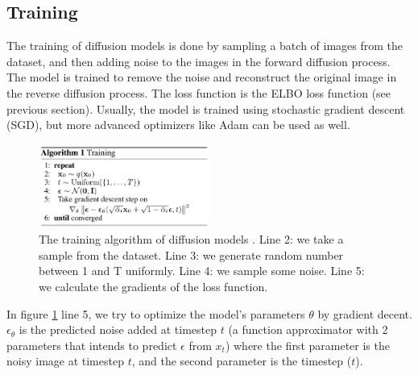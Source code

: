 \subsection{Training}

The training of diffusion models is done by sampling a batch of images from the dataset, and then adding noise to the images in the forward diffusion process. The model is trained to remove the noise and reconstruct the original image in the reverse diffusion process. The loss function is the ELBO loss function (see previous section). Usually, the model is trained using stochastic gradient descent (SGD), but more advanced optimizers like Adam can be used as well.

\begin{figure}
    \centering
    \includegraphics[width=0.5\textwidth]{images/diffusion_models/training.png}
    \caption{The training algorithm of diffusion models \cite{ddpm}. Line 2: we take a sample from the dataset. Line 3: we generate random number between 1 and T uniformly. Line 4: we sample some noise. Line 5: we calculate the gradients of the loss function.}
    \label{fig:ddpm_training}
\end{figure}

In figure \ref{fig:ddpm_training} line 5, we try to optimize the model's parameters $\theta$ by gradient decent. $\epsilon_\theta$ is the predicted noise added at timestep $t$ (a function approximator with 2 parameters that intends to predict $\epsilon$ from $x_t$) where the first parameter is the noisy image at timestep $t$, and the second parameter is the timestep ($t$). 